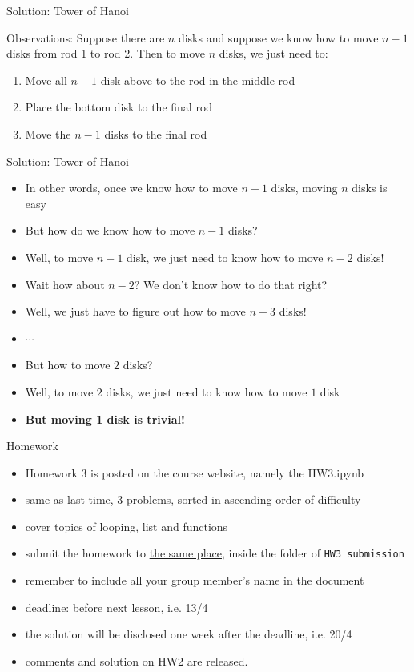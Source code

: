 \documentclass[10pt,xcolor={table,dvipsnames},t]{beamer}
\begin{document}
\begin{frame}{Solution: Tower of Hanoi}
\begin{exampleblock}{Observations:}
Suppose there are $n$ disks and suppose we know how to move $n-1$ disks from rod 1 to rod 2. Then to move $n$ disks, we just need to:
\begin{enumerate}
  \item Move all $n-1$ disk above to the rod in the middle rod
  \item Place the bottom disk to the final rod
  \item Move the $n-1$ disks to the final rod 
\end{enumerate}
\end{exampleblock}
\end{frame}

\begin{frame}{Solution: Tower of Hanoi}
\begin{itemize}
\item In other words, once we know how to move $n-1$ disks, moving $n$ disks is easy
\item But how do we know how to move $n-1$ disks?
\item Well, to move $n-1$ disk, we just need to know how to move $n-2$ disks!
\item Wait how about $n-2$? We don't know how to do that right?
\item Well, we just have to figure out how to move $n-3$ disks!
\item $\cdots$
\item But how to move $2$ disks?
\item Well, to move $2$ disks, we just need to know how to move $1$ disk
\item \textbf{But moving 1 disk is trivial!}
\end{itemize}
\end{frame}

\begin{frame}[fragile]{Homework}
  \begin{itemize}
    \item Homework 3 is posted on the course website, namely the HW3.ipynb
    \item same as last time, 3 problems, sorted in ascending order of difficulty
    \item cover topics of looping, list and functions
    \item submit the homework to \href{https://drive.google.com/drive/folders/1TqSFSwu8-KdzIHZcQWB7PjgqPJen4dsO?usp=sharing}{the same place}, inside the folder of \texttt{HW3 submission}
    \item remember to include all your group member's name in the document
    \item deadline: before next lesson, i.e. 13/4
    \item the solution will be disclosed one week after the deadline, i.e. 20/4
    \item comments and solution on HW2 are released.
  \end{itemize}
\end{frame}
\end{document}
